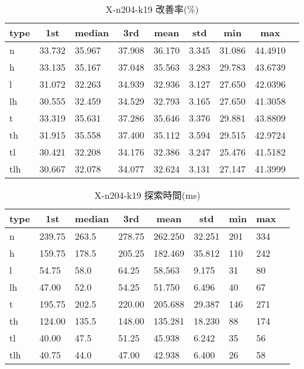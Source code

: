 \begin{table}[htbp]
    \caption{X-n204-k19 改善率(\%)}
    \begin{tabular}{|l|l|l|l|l|l|l|l|l|}\hline
    \multicolumn{1}{|c|}{\textbf{type}}
    &\multicolumn{1}{|c|}{\textbf{1st}}
    &\multicolumn{1}{c|}{\textbf{median}}
    &\multicolumn{1}{c|}{\textbf{3rd}}
    &\multicolumn{1}{c|}{\textbf{mean}}
    &\multicolumn{1}{c|}{\textbf{std}}
    &\multicolumn{1}{c|}{\textbf{min}}
    &\multicolumn{1}{c|}{\textbf{max}}\\\hline
	n & 33.732 & 35.967 & 37.908 & 36.170 & 3.345 & 31.086 & 44.4910\\\hline
	h & 33.135 & 35.167 & 37.048 & 35.563 & 3.283 & 29.783 & 43.6739\\\hline
	l & 31.072 & 32.263 & 34.939 & 32.936 & 3.127 & 27.650 & 42.0396\\\hline
	lh & 30.555 & 32.459 & 34.529 & 32.793 & 3.165 & 27.650 & 41.3058\\\hline
	t & 33.319 & 35.631 & 37.286 & 35.646 & 3.376 & 29.881 & 43.8809\\\hline
	th & 31.915 & 35.558 & 37.400 & 35.112 & 3.594 & 29.515 & 42.9724\\\hline
	tl & 30.421 & 32.208 & 34.176 & 32.386 & 3.247 & 25.476 & 41.5182\\\hline
	tlh & 30.667 & 32.078 & 34.077 & 32.624 & 3.131 & 27.147 & 41.3999\\\hline
	\end{tabular}
\end{table}
\begin{table}[htbp]
    \caption{X-n204-k19 探索時間(ms)}
    \begin{tabular}{|l|l|l|l|l|l|l|l|l|}\hline
    \multicolumn{1}{|c|}{\textbf{type}}
    &\multicolumn{1}{|c|}{\textbf{1st}}
    &\multicolumn{1}{c|}{\textbf{median}}
    &\multicolumn{1}{c|}{\textbf{3rd}}
    &\multicolumn{1}{c|}{\textbf{mean}}
    &\multicolumn{1}{c|}{\textbf{std}}
    &\multicolumn{1}{c|}{\textbf{min}}
    &\multicolumn{1}{c|}{\textbf{max}}\\\hline
	n & 239.75 & 263.5 & 278.75 & 262.250 & 32.251 & 201 & 334\\\hline
	h & 159.75 & 178.5 & 205.25 & 182.469 & 35.812 & 110 & 242\\\hline
	l & 54.75 & 58.0 & 64.25 & 58.563 & 9.175 & 31 & 80\\\hline
	lh & 47.00 & 52.0 & 54.25 & 51.750 & 6.496 & 40 & 67\\\hline
	t & 195.75 & 202.5 & 220.00 & 205.688 & 29.387 & 146 & 271\\\hline
	th & 124.00 & 135.5 & 148.00 & 135.281 & 18.230 & 88 & 174\\\hline
	tl & 40.00 & 47.5 & 51.25 & 45.938 & 6.242 & 35 & 56\\\hline
	tlh & 40.75 & 44.0 & 47.00 & 42.938 & 6.400 & 26 & 58\\\hline
	\end{tabular}
\end{table}
